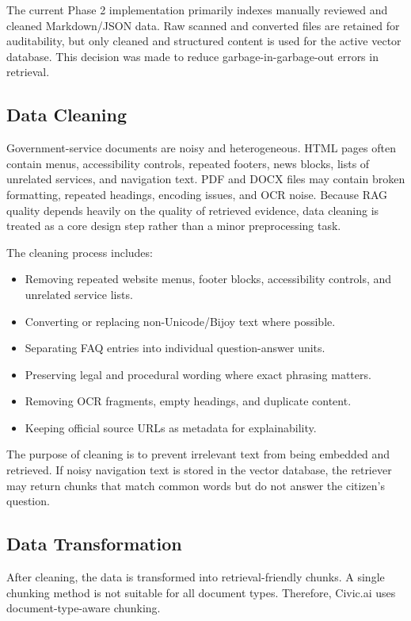 The current Phase 2 implementation primarily indexes manually reviewed and cleaned Markdown/JSON data. Raw scanned and converted files are retained for auditability, but only cleaned and structured content is used for the active vector database. This decision was made to reduce garbage-in-garbage-out errors in retrieval.

\subsection{Data Cleaning}

Government-service documents are noisy and heterogeneous. HTML pages often contain menus, accessibility controls, repeated footers, news blocks, lists of unrelated services, and navigation text. PDF and DOCX files may contain broken formatting, repeated headings, encoding issues, and OCR noise. Because RAG quality depends heavily on the quality of retrieved evidence, data cleaning is treated as a core design step rather than a minor preprocessing task.

The cleaning process includes:

\begin{itemize}
    \item Removing repeated website menus, footer blocks, accessibility controls, and unrelated service lists.
    \item Converting or replacing non-Unicode/Bijoy text where possible.
    \item Separating FAQ entries into individual question-answer units.
    \item Preserving legal and procedural wording where exact phrasing matters.
    \item Removing OCR fragments, empty headings, and duplicate content.
    \item Keeping official source URLs as metadata for explainability.
\end{itemize}

The purpose of cleaning is to prevent irrelevant text from being embedded and retrieved. If noisy navigation text is stored in the vector database, the retriever may return chunks that match common words but do not answer the citizen's question.

\subsection{Data Transformation}

After cleaning, the data is transformed into retrieval-friendly chunks. A single chunking method is not suitable for all document types. Therefore, Civic.ai uses document-type-aware chunking.

